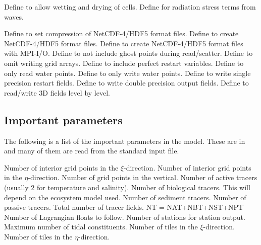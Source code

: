 \begin{klist}
\begin{klist}
  \end{klist}
   \mbox{}
  \begin{klist}
     Define to allow wetting and drying of cells.
     Define for radiation stress terms from
    waves.
  \end{klist}
   \mbox{}
  \begin{klist}
     Define to set compression of NetCDF-4/HDF5 format files.
     Define to create NetCDF-4/HDF5 format files.
     Define to create NetCDF-4/HDF5 format files
    with MPI-I/O.
     Define to not include ghost points during
    read/scatter.
     Define to omit writing grid arrays.
     Define to include perfect restart variables.
     Define to only read water points.
     Define to only write water points.
     Define to write single precision restart fields.
     Define to write double precision output fields.
     Define to read/write 3D fields level by level.
  \end{klist}
\end{klist}

\subsection{Important parameters}
\label{Parms}
The following is a list of the important parameters in the model. These
are in  and many of them are read from the standard
input file.
\begin{klist}
   Number of interior grid points in the $\xi$-direction.
   Number of interior grid points in the $\eta$-direction.
   Number of grid points in the vertical.
   Number of active tracers (usually 2 for temperature and
    salinity).
   Number of biological tracers. This will depend on the
    ecosystem model used.
   Number of sediment tracers.
   Number of passive tracers.
   Total number of tracer fields. NT = NAT+NBT+NST+NPT
   Number of Lagrangian floats to follow.
   Number of stations for station output.
   Maximum number of tidal constituents.
   Number of tiles in the $\xi$-direction.
   Number of tiles in the $\eta$-direction.
\end{klist}


